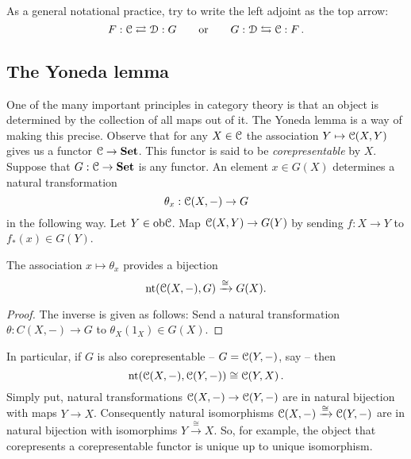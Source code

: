 As a general notational practice, try to write the left adjoint as the top 
arrow: 
\[
F:\mathcal C\rightleftarrows\mathcal D:G \qquad\hbox{or}\qquad G:\mathcal D\leftrightarrows\mathcal C:F \,.
\]
 



\subsection{The Yoneda lemma}
One of the many important principles in category theory is that an object is determined by the collection of all maps out of it.
The Yoneda lemma is a way of making this precise. Observe that 
for any $X\in\mathcal C$ the association $Y\mapsto\mathcal C(X,Y)$ gives us a functor
$\mathcal C\to\mathbf{Set}$. This functor is said to be {\em corepresentable} by $X$.
Suppose that $G:\mathcal C\to\mathbf{Set}$ is any functor. An element $x\in G(X)$ 
determines a natural transformation 
\[
\theta_x:\mathcal C(X,-)\to G
\]
in the following way. Let $Y\in\mathrm{ob}\mathcal C$. Map $\mathcal C(X,Y)\to G(Y)$
by sending $f:X\to Y$ to $f_*(x)\in G(Y)$. 

\begin{lemma}
The association $x\mapsto\theta_x$ provides a bijection
    $$\mathrm{nt}(\mathcal C(X,-),G)\xrightarrow{\cong}G(X).$$
\end{lemma}
\begin{proof}
The inverse is given as follows: Send a natural transformation 
$\theta:C(X,-)\to G$ to $\theta_X(1_X)\in G(X)$. 
\end{proof}
In particular, if $G$ is also corepresentable -- $G=\mathcal C(Y,-)$, say --
then 
\[
\mathrm{nt}(\mathcal C(X,-),\mathcal C(Y,-))\cong \mathcal C(Y,X)\,.
\]
Simply put, natural transformations $\mathcal C(X,-)\to \mathcal C(Y,-)$ are in natural
bijection with maps $Y\to X$. Consequently natural isomorphisms 
$\mathcal C(X,-)\xrightarrow{\cong}\mathcal C(Y,-)$ are in natural bijection with 
isomorphims $Y\xrightarrow{\cong}X$. 
So, for example, the object that corepresents a corepresentable functor 
is unique up to unique isomorphism.

